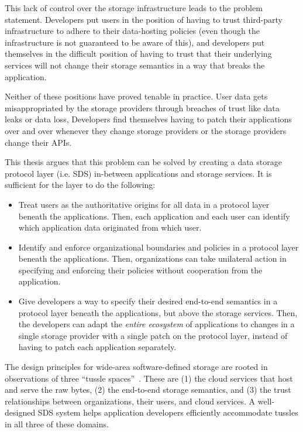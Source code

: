 This lack of control over the storage infrastructure leads to the problem statement.  Developers
put users in the position of having to trust third-party infrastructure
to adhere to their data-hosting policies (even though the infrastructure is not
guaranteed to be aware of this), and developers put themselves in the difficult
position of having to trust that their underlying services will not change their
storage semantics in a way that breaks the application.

Neither of these
positions have proved tenable in practice.  User data gets misappropriated by the storage
providers through breaches of trust like data leaks or data loss, Developers
find themselves having to patch their applications over and over whenever they
change storage providers or the storage providers change their APIs.

This thesis argues that this problem can be solved by creating a data storage
protocol layer (i.e. SDS) in-between applications and storage services.  It is sufficient
for the layer to do the following:

\begin{itemize}
   \item Treat users as the authoritative origins for all data in a protocol
      layer beneath the applications.  Then, each application and each user
      can identify which application data originated from which user.
   \item Identify and enforce organizational boundaries and policies in a protocol layer
      beneath the applications.  Then, organizations can take unilateral action
      in specifying and enforcing their policies without cooperation from the
      application.
   \item Give developers a way to specify their desired end-to-end semantics in
      a protocol layer beneath the applications, but above the storage services.
      Then, the developers can adapt the \emph{entire ecosystem} of applications
      to changes in a single storage provider with a
      single patch on the protocol layer,
      instead of having to patch each application separately.
\end{itemize}

The design principles for wide-area software-defined storage are rooted in 
observations of three ``tussle spaces''~\cite{david-clark-tussle-spaces}.
These are (1) the cloud services that host and serve the raw
bytes, (2) the end-to-end storage semantics, and (3) the trust
relationships between organizations, their users, and cloud services.
A well-designed SDS system helps application developers efficiently accommodate tussles
in all three of these domains.

